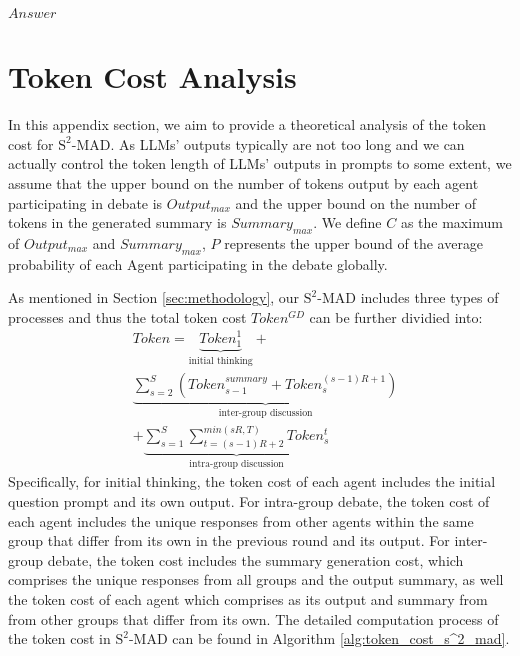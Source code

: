 \begin{breakablealgorithm}
\begin{algorithmic}[1]
    \State \Return $Answer$
    \end{algorithmic}
\end{breakablealgorithm}

\section{Token Cost Analysis} \label{appendix:token-cost-S^2-MAD}
In this appendix section, we aim to provide a theoretical analysis of the token cost for \({\text{S}^2\text{-MAD}}\). As LLMs' outputs typically are not too long and we can actually control the token length of LLMs' outputs in prompts to some extent, we assume that the upper bound on the number of tokens output by each agent participating in debate is $Output_{max}$ and the upper bound on the number of tokens in the generated summary is $Summary_{max}$. We define $C$ as the maximum of $Output_{max}$ and $Summary_{max}$, $P$ represents the upper bound of the average probability of each Agent participating in the debate globally.

As mentioned in Section \ref{sec:methodology}, our \({\text{S}^2\text{-MAD}}\) includes three types of processes and thus the total token cost $Token^{GD}$ can be further dividied into:
\begin{equation}
\begin{aligned} 
    &Token = \underbrace{Token_1^1}_\text{initial thinking} + \\ 
    &\underbrace{\sum_{s=2}^{S}(Token^{summary}_{s-1}+Token_s^{(s-1)R+1})}_\text{inter-group discussion} \\
    &+ \underbrace{\sum_{s=1}^{S}\sum_{t=(s-1)R+2}^{min(sR,T)}Token_s^t}_\text{intra-group discussion}
\end{aligned}
\end{equation}\label{eq:divide}
Specifically, for initial thinking, the token cost of each agent includes the initial question prompt and its own output. For intra-group debate, the token cost of each agent includes the unique responses from other agents within the same group that differ from its own in the previous round and its output. For inter-group debate, the token cost includes the summary generation cost, which comprises the unique responses from all groups and the output summary, as well the token cost of each agent which comprises as its output and summary from from other groups that differ from its own. The detailed computation process of the token cost in \({\text{S}^2\text{-MAD}}\) can be found in Algorithm \ref{alg:token_cost_s^2_mad}.

